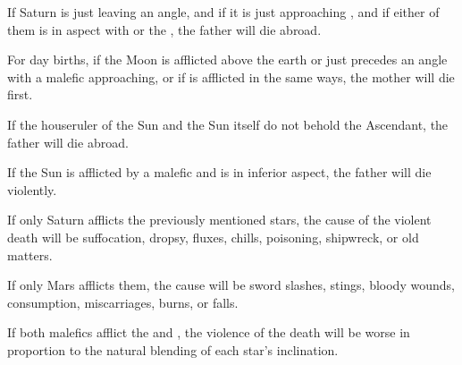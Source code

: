 If Saturn is just leaving an angle, and if it is just approaching \Mars, and if either of them is in aspect with \Jupiter\xspace or the \Sun, the father will die abroad.

For day births, if the Moon is afflicted above the earth or just precedes an angle with a malefic approaching, or if \Venus\xspace is afflicted in the same ways, the mother will die first. 

If the houseruler of the Sun and the Sun itself do not behold the Ascendant, the father will die abroad. 

If the Sun is afflicted by a malefic and \Jupiter\xspace is in inferior aspect, the father will die violently. 

If only Saturn afflicts the previously mentioned stars, the cause of the violent death will be suffocation, dropsy, fluxes, chills, poisoning, shipwreck, or old matters. 

If only Mars afflicts them, the cause will be sword slashes, stings, bloody wounds, consumption, miscarriages, burns, or falls. 

If both malefics afflict the \Sun\xspace and \Jupiter, the violence of the death will be worse in proportion to the natural blending of each star’s inclination.

\newpage